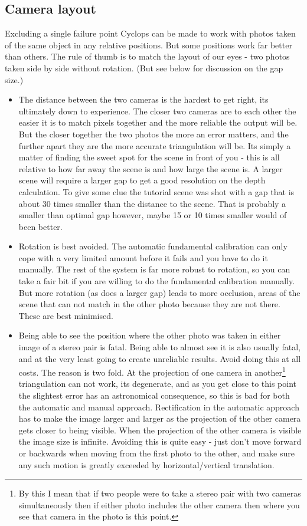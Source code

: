 \documentclass[10pt,a4paper,twoside]{article}
\begin{document}
\subsection{Camera layout}
Excluding a single failure point Cyclops can be made to work with photos taken of the same object in any relative positions.
But some positions work far better than others.
The rule of thumb is to match the layout of our eyes - two photos taken side by side without rotation. (But see below for discussion on the gap size.)
\begin{itemize}
\item The distance between the two cameras is the hardest to get right, its ultimately down to experience. The closer two cameras are to each other the easier it is to match pixels together and the more reliable the output will be. But the closer together the two photos the more an error matters, and the further apart they are the more accurate triangulation will be. Its simply a matter of finding the sweet spot for the scene in front of you - this is all relative to how far away the scene is and how large the scene is. A larger scene will require a larger gap to get a good resolution on the depth calculation. To give some clue the tutorial scene was shot with a gap that is about 30 times smaller than the distance to the scene. That is probably a smaller than optimal gap however, maybe 15 or 10 times smaller would of been better.

\item Rotation is best avoided. The automatic fundamental calibration can only cope with a very limited amount before it fails and you have to do it manually. The rest of the system is far more robust to rotation, so you can take a fair bit if you are willing to do the fundamental calibration manually. But more rotation (as does a larger gap) leads to more occlusion, areas of the scene that can not match in the other photo because they are not there. These are best minimised.

\item Being able to see the position where the other photo was taken in either image of a stereo pair is fatal. Being able to almost see it is also usually fatal, and at the very least going to create unreliable results. Avoid doing this at all costs. The reason is two fold. At the projection of one camera in another\footnote{By this I mean that if two people were to take a stereo pair with two cameras simultaneously then if either photo includes the other camera then where you see that camera in the photo is this point.} triangulation can not work, its degenerate, and as you get close to this point the slightest error has an astronomical consequence, so this is bad for both the automatic and manual approach. Rectification in the automatic approach has to make the image larger and larger as the projection of the other camera gets closer to being visible. When the projection of the other camera is visible the image size is infinite. Avoiding this is quite easy - just don't move forward or backwards when moving from the first photo to the other, and make sure any such motion is greatly exceeded by horizontal/vertical translation.
\end{itemize}
\end{document}
